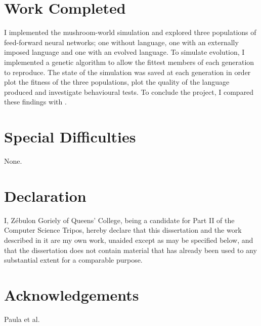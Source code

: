 \documentclass[12pt,a4paper,twoside,openright]{report}
\begin{document}
\section*{Work Completed}

I implemented the mushroom-world simulation and explored three populations of feed-forward neural networks; one without language, one with an externally imposed language and one with an evolved language. To simulate evolution, I implemented a genetic algorithm to allow the fittest members of each generation to reproduce. The state of the simulation was saved at each generation in order plot the fitness of the three populations, plot the quality of the language produced and investigate behavioural tests. To conclude the project, I compared these findings with \citet{Cangelosi1998}.

\section*{Special Difficulties}

None.
 
\newpage
\section*{Declaration}

I, Z\'ebulon Goriely of Queens' College, being a candidate for Part II of the Computer
Science Tripos, hereby declare
that this dissertation and the work described in it are my own work,
unaided except as may be specified below, and that the dissertation
does not contain material that has already been used to any substantial
extent for a comparable purpose.

\bigskip
{}

\medskip
{}

\tableofcontents

\listoffigures

\newpage
\section*{Acknowledgements}

Paula et al.

\end{document}
